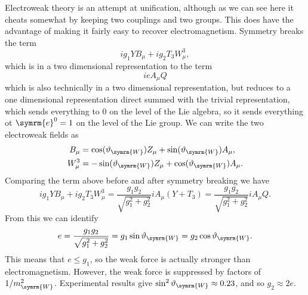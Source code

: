 \documentclass[fleqn]{NotesClass}
\newcommand{\Pparticle}[1]{\symrm{#1}}
\newcommand{\PW}{\ensuremath{\Pparticle{W}}}
\newcommand{\e}{\symrm{e}}
\begin{document}
    Electroweak theory is an attempt at unification, although as we can see here it cheats somewhat by keeping two couplings and two groups.
    This does have the advantage of making it fairly easy to recover electromagnetism.
    Symmetry breaks the term
    \begin{equation}
        ig_1 Y B_\mu + ig_2 T_3 W^3_\mu,
    \end{equation}
    which is in a two dimensional representation to the term
    \begin{equation}
        ieA_\mu Q
    \end{equation}
    which is also technically in a two dimensional representation, but reduces to a one dimensional representation direct summed with the trivial representation, which sends everything to 0 on the level of the Lie algebra, so it sends everything ot \(\e^0 = 1\) on the level of the Lie group.
    We can write the two electroweak fields as
    \begin{align}
        B_\mu &= \cos(\vartheta_{\PW}) Z_\mu + \sin(\vartheta_{\PW}) A_\mu,\\
        W^3_\mu &= -\sin(\vartheta_{\PW}) Z_\mu + \cos(\vartheta_{\PW}) A_\mu.
    \end{align}
    Comparing the term above before and after symmetry breaking we have
    \begin{equation}
        ig_1 Y B_\mu + ig_2 T_3 W^3_\mu = \frac{g_1 g_2}{\sqrt{g_1^2 + g_2^2}} iA_\mu(Y + T_3) = \frac{g_1g_2}{\sqrt{g_1^2 + g_2^2}} iA_\mu Q.
    \end{equation}
    From this we can identify
    \begin{equation}
        e = \frac{g_1 g_2}{\sqrt{g_1^2 + g_2^2}} = g_1 \sin \vartheta_{\PW} = g_2 \cos \vartheta_{\PW}.
    \end{equation}
    This means that \(e \le g_1\), so the weak force is actually stronger than electromagnetism.
    However, the weak force is suppressed by factors of \(1/m_{\PW}^2\).
    Experimental results give \(\sin^2\vartheta_{\PW} \approx 0.23\), and so \(g_2 \approx 2e\).
    
    
    
    
    
    \backmatter
    \printindex
\end{document}
